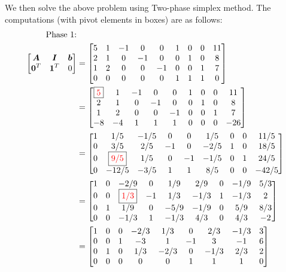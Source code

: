 \documentclass[a4paper,11pt]{article}
\newcommand{\V}[1]{\boldsymbol{#1}}
\begin{document}
\noindent We then solve the above problem using Two-phase simplex method. The computations (with pivot elements in boxes) are as follows:
\begin{align}
\text{Phase 1:}&\nonumber\\
%
\begin{bmatrix}
 \V{A}& \V{I}& \V{b}\\
 \V{0}^T& \V{1}^T& 0
\end{bmatrix}
% 
&=\begin{bmatrix}
5&	1&	-1&	0&	0&	1&	0&	0&	11\\
2&	1&	0&	-1&	0&	0&	1&	0&	8\\
1&	2&	0&	0&	-1&	0&	0&	1&	7\\
0&	0&	0&	0&	0&	1&	1&	1&	0
\end{bmatrix}\nonumber\\
% 
&=\begin{bmatrix}
\fbox{{\color{red}5}}&	1&	-1&	0&	0&	1&	0&	0&	11\\
2&	1&	0&	-1&	0&	0&	1&	0&	8\\
1&	2&	0&	0&	-1&	0&	0&	1&	7\\
-8&	-4&	1&	1&	1&	0&	0&	0&	-26
\end{bmatrix}\nonumber\\
% 
&=\begin{bmatrix}
1&	1/5&	-1/5&	0&	0&	1/5&	0&	0&	11/5\\
0&	3/5&	2/5&	-1&	0&	-2/5&	1&	0&	18/5\\
0&	\fbox{{\color{red}9/5}}&	1/5&	0&	-1&	-1/5&	0&	1&	24/5\\
0&	-12/5&	-3/5&	1&	1&	8/5&	0&	0&	-42/5
\end{bmatrix}\nonumber\\
% 
&=\begin{bmatrix}
1&	0&	-2/9&	0&	1/9&	2/9&	0&	-1/9&	5/3\\
0&	0&	\fbox{{\color{red}1/3}}&	-1&	1/3&	-1/3&	1&	-1/3&	2\\
0&	1&	1/9&	0&	-5/9&	-1/9&	0&	5/9&	8/3\\
0&	0&	-1/3&	1&	-1/3&	4/3&	0&	4/3&	-2
\end{bmatrix}\nonumber\\
% 
&=\begin{bmatrix}
1&	0&	0&	-2/3&	1/3&	0&	2/3&	-1/3&	3\\
0&	0&	1&	-3&	1&	-1&	3&	-1&	6\\
0&	1&	0&	1/3&	-2/3&	0&	-1/3&	2/3&	2\\
0&	0&	0&	0&	0&	1&	1&	1&	0
\end{bmatrix}\nonumber
\end{align}
\end{document}
